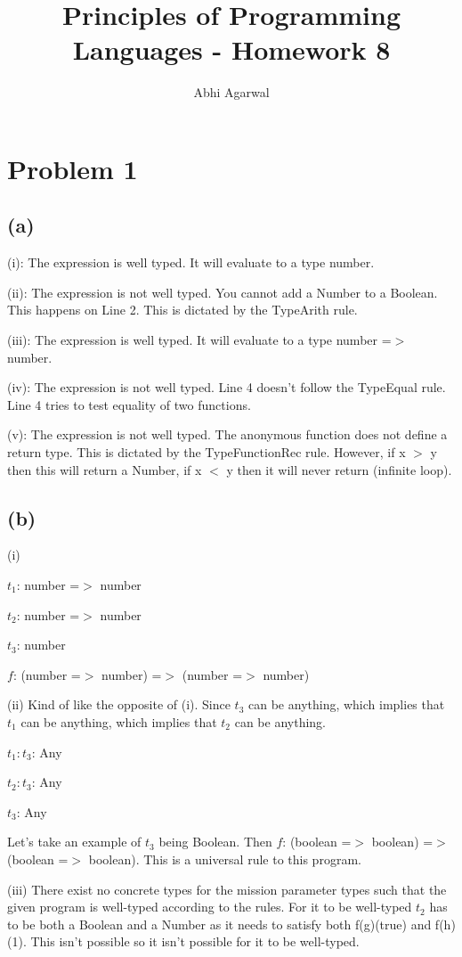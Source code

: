\documentclass[11pt, oneside]{article}
\title{Principles of Programming Languages - Homework 8}
\author{Abhi Agarwal}
\date{}
\newcommand{\forceindent}{\leavevmode{\parindent=1.5em\indent}}
\begin{document}
\maketitle
\section{Problem 1}
\subsection*{(a)}
\forceindent \par (i): The expression is well typed. It will evaluate to a type number.
\par (ii): The expression is not well typed. You cannot add a Number to a Boolean. This happens on Line 2. This is dictated by the TypeArith rule.
\par (iii): The expression is well typed. It will evaluate to a type number =$>$ number.
\par (iv): The expression is not well typed. Line 4 doesn't follow the TypeEqual rule. Line 4 tries to test equality of two functions. 
\par (v): The expression is not well typed. The anonymous function does not define a return type. This is dictated by the TypeFunctionRec rule. However, if x $>$ y then this will return a Number, if x $<$ y then it will never return (infinite loop).

\subsection*{(b)}
\forceindent \par (i)
\forceindent \par $t_1$: number =$>$ number
\forceindent \par $t_2$: number =$>$ number
\forceindent \par $t_3$: number
\forceindent \par $f$: (number =$>$ number) =$>$ (number =$>$ number)

\forceindent \par (ii) Kind of like the opposite of (i). Since $t_3$ can be anything, which implies that $t_1$ can be anything, which implies that $t_2$ can be anything. 
\forceindent \par $t_1: t_3$: Any
\forceindent \par $t_2: t_3$: Any
\forceindent \par $t_3$: Any
\par Let's take an example of $t_3$ being Boolean. Then $f$: (boolean =$>$ boolean) =$>$ (boolean =$>$ boolean). This is a universal rule to this program.

\forceindent \par (iii) There exist no concrete types for the mission parameter types such that the given program is well-typed according to the rules. For it to be well-typed $t_2$ has to be both a Boolean and a Number as it needs to satisfy both f(g)(true) and f(h)(1). This isn't possible so it isn't possible for it to be well-typed.
\end{document}
